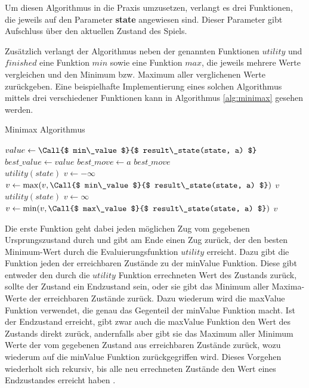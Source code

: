 
Um diesen Algorithmus in die Praxis umzusetzen, verlangt es drei Funktionen, die jeweils auf den Parameter \textbf{state} angewiesen sind. Dieser Parameter gibt Aufschluss über den aktuellen Zustand des Spiels.

Zusätzlich verlangt der Algorithmus neben der genannten Funktionen $utility$ und $finished$ eine Funktion $min$ sowie eine Funktion $max$, die jeweils mehrere Werte vergleichen und den Minimum bzw. Maximum aller verglichenen Werte zurückgeben. Eine beispielhafte Implementierung eines solchen Algorithmus mittels drei verschiedener Funktionen kann in Algorithmus \ref{alg:minimax} gesehen werden.

\begin{algorithm}[h]
\caption{Minimax Algorithmus \cite{Russell2010}}
\label{alg:minimax}
\begin{algorithmic}
		\State $ value  \gets \Call{$ min\_value $}{$ result\_state(state, a) $}$
			\State $ best\_value  \gets  value $
			\State $ best\_move  \gets  a $
		\EndIf
	\EndFor
	\State \Return $ best\_move $
\EndFunction
\\
	 \State \Return $ utility(state) $ \EndIf
	\State $ v  \gets -\infty$
		\State $v \gets \max( v , \Call{$ min\_value $}{$ result\_state(state, a) $})$
	\EndFor
	\State \Return $v$
\EndFunction
\\
	 \State \Return $ utility(state) $ \EndIf
	\State $ v  \gets \infty$
		\State $v \gets \min( v , \Call{$ max\_value $}{$ result\_state(state, a) $})$
	\EndFor
	\State \Return $v$
\EndFunction
\end{algorithmic}
\end{algorithm}

Die erste Funktion geht dabei jeden möglichen Zug vom gegebenen Ursprungszustand durch und gibt am Ende einen Zug zurück, der den besten Minimum-Wert durch die Evaluierungsfunktion $utility$ erreicht. Dazu gibt die Funktion jeden der erreichbaren Zustände zu der minValue Funktion. Diese gibt entweder den durch die $utility$ Funktion errechneten Wert des Zustands zurück, sollte der Zustand ein Endzustand sein, oder sie gibt das Minimum aller Maxima-Werte der erreichbaren Zustände zurück. Dazu wiederum wird die maxValue Funktion verwendet, die genau das Gegenteil der minValue Funktion macht. Ist der Endzustand erreicht, gibt zwar auch die maxValue Funktion den Wert des Zustands direkt zurück, andernfalls aber gibt sie das Maximum aller Minimum Werte der vom gegebenen Zustand aus erreichbaren Zustände zurück, wozu wiederum auf die minValue Funktion zurückgegriffen wird. Dieses Vorgehen wiederholt sich rekursiv, bis alle neu errechneten Zustände den Wert eines Endzustandes erreicht haben \cite{Russell2010}.

